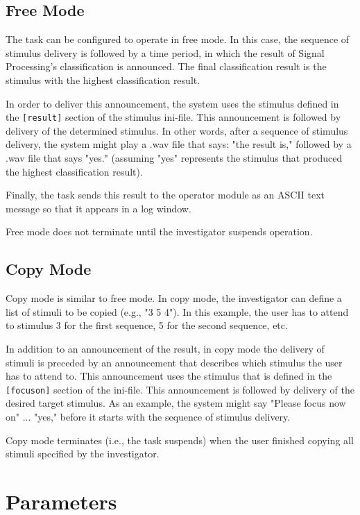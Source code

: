 \documentclass[letterpaper,oneside,12pt]{article}
\begin{document}
\subsection{Free Mode}

The task can be configured to operate in free mode. In this case, the sequence 
of stimulus delivery is followed by a time period, in which the result of Signal 
Processing's classification is announced. The final classification result is
the stimulus with the highest classification result.

In order to deliver this announcement, the system uses the stimulus defined in 
the \texttt{[result]} section of the stimulus ini-file. This announcement is 
followed by delivery of the determined stimulus. In other words, after a 
sequence of stimulus delivery, the system might play a .wav file that says: "the 
result is," followed by a .wav file that says "yes." (assuming "yes" represents
the stimulus that produced the highest classification result).

Finally, the task sends this result to the operator module as an ASCII text 
message so that it appears in a log window.

Free mode does not terminate until the investigator suspends operation.


\subsection{Copy Mode}

Copy mode is similar to free mode. In copy mode, the investigator can define a 
list of stimuli to be copied (e.g., "3 5 4"). In this example, the user has to 
attend to stimulus 3 for the first sequence, 5 for the second sequence, etc.

In addition to an announcement of the result, in copy mode the delivery of 
stimuli is preceded by an announcement that describes which stimulus the user
has to attend to. This announcement uses the stimulus that is defined in the
\texttt{[focuson]} section of the ini-file. This announcement is followed by
delivery of the desired target stimulus. As an example, the system might say
"Please focus now on" ... "yes," before it starts with the sequence of
stimulus delivery.

Copy mode terminates (i.e., the task suspends) when the user finished copying 
all stimuli specified by the investigator.

\section{Parameters}
\end{document}
